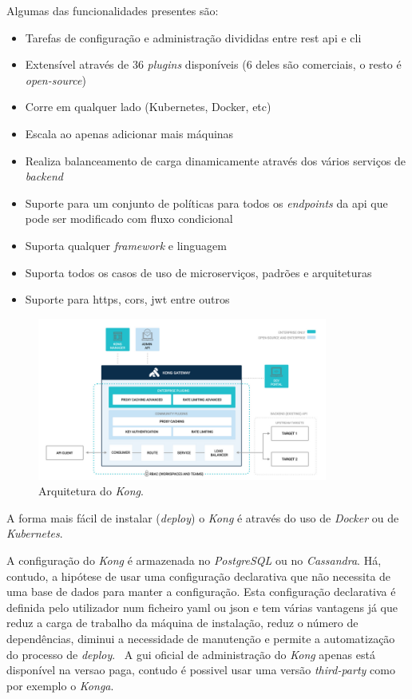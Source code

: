 Algumas das funcionalidades presentes são:~\cite{kong}
\begin{itemize}
    \item Tarefas de configuração e administração divididas entre \acrshort{rest} \acrshort{api} e \acrshort{cli}
    \item Extensível através de 36 \textit{plugins} disponíveis (6 deles são comerciais, o resto é \textit{open-source})
    \item Corre em qualquer lado (Kubernetes, Docker, etc)
    \item Escala ao apenas adicionar mais máquinas
    \item Realiza balanceamento de carga dinamicamente através dos vários serviços de \textit{backend}
    \item Suporte para um conjunto de políticas para todos os \textit{endpoints} da \acrshort{api} que pode ser modificado com fluxo condicional
    \item Suporta qualquer \textit{framework} e linguagem
    \item Suporta todos os casos de uso de microserviços, padrões e arquiteturas
    \item Suporte para \acrshort{https}, \acrshort{cors}, \acrshort{jwt} entre outros
\end{itemize}

\begin{figure}[H]
    \begin{center}
        \includegraphics[width=0.85\textwidth]{img/kongArch.png}
    \end{center}
    \caption{Arquitetura do \textit{Kong}.~\cite{kongArch}}
\end{figure}

A forma mais fácil de instalar (\textit{deploy}) o \textit{Kong} é através do uso de \textit{Docker} ou de \textit{Kubernetes}.

A configuração do \textit{Kong} é armazenada no \textit{PostgreSQL} ou no \textit{Cassandra}. Há, contudo, a hipótese de usar uma configuração declarativa que não necessita de uma base de dados para manter a configuração. Esta configuração declarativa é definida pelo utilizador num ficheiro \acrshort{yaml} ou \acrshort{json} e tem várias vantagens já que reduz a carga de trabalho da máquina de instalação, reduz o número de dependências, diminui a necessidade de manutenção e permite a automatização do processo de \textit{deploy}.~\cite{KongDBLess} A \acrshort{gui} oficial de administração do \textit{Kong} apenas está disponível na versao paga, contudo é possivel usar uma versão \textit{third-party} como por exemplo o \textit{Konga}.

